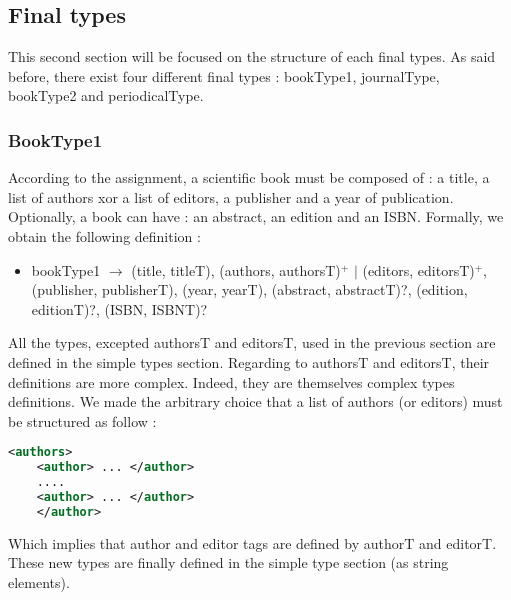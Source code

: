 \documentclass{article}
\begin{document}
\subsection{Final types}
This second section will be focused on the structure of each final types. As said before, there exist four different final types : bookType1, journalType, bookType2 and periodicalType.

\subsubsection{BookType1}
According to the assignment, a scientific book must be composed of : a title, a list of authors xor a list of editors, a publisher and a year of publication. Optionally, a book can have : an abstract, an edition and an ISBN. Formally, we obtain the following definition :
\begin{itemize}
\item bookType1 $\rightarrow$ (title, titleT), (authors, authorsT)$^+$ $|$ (editors, editorsT)$^+$, (publisher, publisherT), (year, yearT), (abstract, abstractT)?, (edition, editionT)?, (ISBN, ISBNT)?
\end{itemize}
All the types, excepted authorsT and editorsT, used in the previous section are defined in the simple types section. Regarding to authorsT and editorsT, their definitions are more complex. Indeed, they are themselves complex types definitions. We made the arbitrary choice that a list of authors (or editors) must be structured as follow : 
\begin{lstlisting}[language=XML]
    <authors>
	<author> ... </author>
	....
	<author> ... </author>
    </author>
\end{lstlisting}
Which implies that author and editor tags are defined by authorT and editorT. These new types are finally defined in the simple type section (as string elements).
\end{document}
